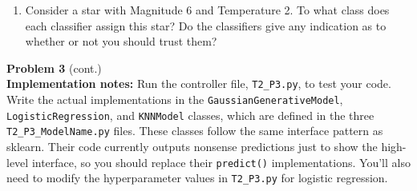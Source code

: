 \documentclass[submit]{harvardml}
\begin{document}
\begin{problem}
\begin{enumerate}
    \item Consider a star with Magnitude 6 and Temperature 2.
      To what class does each classifier assign this star? Do the
      classifiers give any indication as to whether or not you should
  trust them?
\end{enumerate}
\end{problem}

\newpage

\begin{framed}
\noindent\textbf{Problem 3} (cont.)\\


\textbf{Implementation notes:} Run the controller file, \texttt{T2\_P3.py},
to test your code. Write the actual implementations in the \texttt{GaussianGenerativeModel},
\texttt{LogisticRegression}, and \texttt{KNNModel} classes, which are defined in the three
\texttt{T2\_P3\_ModelName.py} files. These classes follow the same interface pattern
as sklearn. Their code
currently outputs nonsense predictions just to show the
high-level interface, so you should replace their \texttt{predict()} implementations.
You'll also need to modify the hyperparameter
values in \texttt{T2\_P3.py} for logistic regression.
\end{framed}
\newpage
\end{document}
